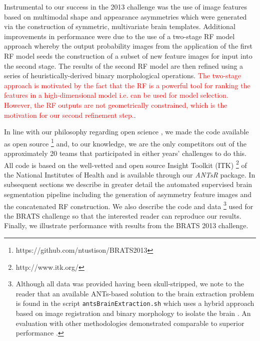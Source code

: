 \documentclass[preprint,authoryear,review,12pt]{elsarticle}
\begin{document}


Instrumental to our success in the 2013 challenge 
was the use of image features based on multimodal shape and appearance 
asymmetries which were generated via the construction of symmetric, 
multivariate brain templates.  Additional improvements in performance
were due to the use of a two-stage RF model approach
whereby the output probability images from the application of the first
RF model seeds the construction of a subset of new feature images
for input into the second stage.  The results of the second RF model
are then refined using a series of heuristically-derived binary morphological
operations.  \textcolor{red}{The two-stage approach is motivated by
the fact that the RF is a powerful tool for ranking the features
in a high-dimensional model i.e. can be used for model selection.
However, the RF outputs are not geometrically constrained, which is
the motivation for our second refinement step.}.

In line with our philosophy regarding open science \citep{tustison2013,ince2012}, 
we made the code available as open source%
\footnote{
https://github.com/ntustison/BRATS2013
}
and, to our knowledge, we are the only competitors out of the approximately 20 teams 
that participated in either years' challenges to do this.  All code is based
on the well-vetted and open source Insight Toolkit (ITK)%
\footnote{
http://www.itk.org/
} 
of the National Institutes of Health and is available through our \textit{ANTsR} 
package.
In subsequent sections we describe in greater detail the automated 
supervised brain segmentation pipeline including the generation of asymmetry
feature images and the concatenated RF construction.  We also
describe the code and data%
\footnote{
Although all data was provided having been skull-stripped, 
we note to the reader that an
available ANTs-based solution to the brain extraction problem
is found in the script {\tt antsBrainExtraction.sh} which uses
a hybrid approach based on image registration and binary morphology
to isolate the brain \citep{avants2010a}.  An evaluation with other
methodologies demonstrated comparable to superior performance 
\citep{avants2010a}.
} 
used for the BRATS challenge so that 
the interested reader can reproduce our results.  Finally, we 
illustrate performance with results from the BRATS 2013 challenge.
\end{document}
